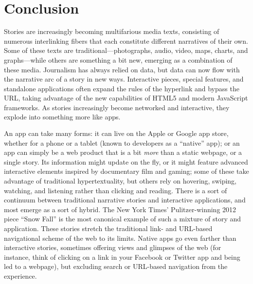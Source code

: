 \chapter{Conclusion}


Stories are increasingly becoming multifarious media texts, consisting of numerous interlinking fibers that each constitute different narratives of their own. Some of these texts are traditional---photographs, audio, video, maps, charts, and graphs---while others are something a bit new, emerging as a combination of these media. Journalism has always relied on data, but data can now flow with the narrative arc of a story in new ways. Interactive pieces, special features, and standalone applications often expand the rules of the hyperlink and bypass the URL, taking advantage of the new capabilities of HTML5 and modern JavaScript frameworks. As stories increasingly become networked and interactive, they explode into something more like apps.

An app can take many forms: it can live on the Apple or Google app store, whether for a phone or a tablet (known to developers as a ``native'' app); or an app can simply be a web product that is a bit \emph{more} than a static webpage, or a single story. Its information might update on the fly, or it might feature advanced interactive elements inspired by documentary film and gaming; some of these take advantage of traditional hypertextuality, but others rely on hovering, swiping, watching, and listening rather than clicking and reading. There is a sort of continuum between traditional narrative stories and interactive applications, and most emerge as a sort of hybrid. The New York Times' Pulitzer-winning 2012 piece ``Snow Fall'' is the most canonical example of such a mixture of story and application.\autocite{branch_snow_2012} These stories stretch the traditional link- and URL-based navigational scheme of the web to its limits. Native apps go even farther than interactive stories, sometimes offering views and glimpses of the web (for instance, think of clicking on a link in your Facebook or Twitter app and being led to a webpage), but excluding search or URL-based navigation from the experience.

